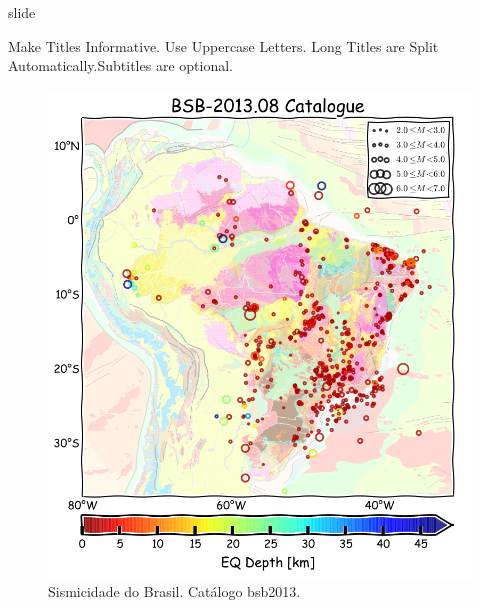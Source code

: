 \documentclass[ucs,8pt]{beamer}
\begin{document}
\begin{frame}{slide}


\end{frame}




\begin{frame}{Make Titles Informative. Use Uppercase Letters. Long Titles are Split Automatically.}{Subtitles are optional.}

	\begin{figure}[H]
	  \centering
	  \includegraphics[height=.90\textheight]{seismicity_br} 
	  \caption{Sismicidade do Brasil. Catálogo \gls{bsb2013}.}
	  \label{fig:br_seis} 
	\end{figure}


\end{frame}
\end{document}
